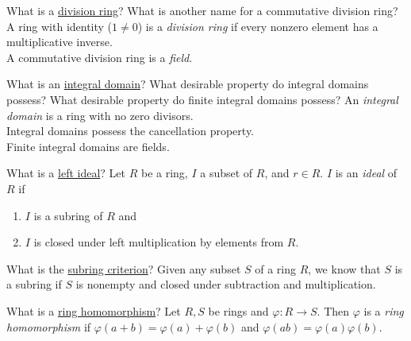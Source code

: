 \documentclass[avery5371,grid]{flashcards}
\let \phi \varphi
\begin{document}
\begin{flashcard}[Rings]{What is a \underline{division ring}? What is another name for a commutative division ring?}
 A ring with identity ($1 \neq 0$) is a \emph{division ring} if every nonzero element has a multiplicative inverse.\\
 
 A commutative division ring is a \emph{field}.
\end{flashcard}

\begin{flashcard}[Rings]{What is an \underline{integral domain}? What desirable property do integral domains possess? What desirable property do finite integral domains possess?}
 An \emph{integral domain} is a ring with no zero divisors.\\
 
 Integral domains possess the cancellation property.\\
 
 Finite integral domains are fields.
\end{flashcard}

\begin{flashcard}[Rings]{What is a \underline{left ideal}?}
 Let $R$ be a ring, $I$ a subset of $R$, and $r \in R$. $I$ is an \emph{ideal} of $R$ if 
 \begin{enumerate}
      \item $I$ is a subring of $R$ and
      \item $I$ is closed under left multiplication by elements from $R$.
 \end{enumerate}
\end{flashcard}

\begin{flashcard}[Rings]{What is the \underline{subring criterion}?}
 Given any subset $S$ of a ring $R$, we know that $S$ is a subring if $S$ is nonempty and closed under subtraction and multiplication.
\end{flashcard}

\begin{flashcard}[Rings]{What is a \underline{ring homomorphism}?}
 Let $R,S$ be rings and $\phi: R \to S$. Then $\phi$ is a \emph{ring homomorphism} if $\phi(a+b) = \phi(a) + \phi(b)$ and $\phi(ab) = \phi(a) \phi(b)$.
\end{flashcard}
\end{document}
